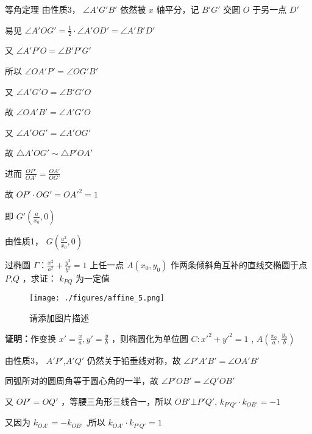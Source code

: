 \begin{corollary}{}
\begin{corollary}{等角定理}
由性质3， $\displaystyle{\angle A'G'B'}$ 依然被 $\displaystyle{x}$ 轴平分，记 $\displaystyle{B'G'}$ 交圆 $\displaystyle{O}$ 于另一点 $\displaystyle{D'}$

易见 $\displaystyle{\angle A'OG'=\frac{1}{2}\cdot\angle A'OD'=\angle A'B'D'}$ 

又 $\displaystyle{\angle A'P'O=\angle B'P'G'}$

所以 $\displaystyle{\angle OA'P'=\angle OG'B'}$

又 $\displaystyle{\angle A'G'O=\angle B'G'O}$

故 $\displaystyle{\angle OA'B'=\angle A'G'O}$

又 $\displaystyle{\angle A'OG'=\angle A'OG'}$

故 $\displaystyle{\triangle A'OG'\sim \triangle P'OA'}$

进而 $\displaystyle{\frac{OP'}{OA'}=\frac{OA'}{OG'}}$

故 $\displaystyle{OP'\cdot OG'=OA'^2=1}$ 

即 $\displaystyle{G'\left(\frac{a}{x_0},0\right)}$

由性质1， $\displaystyle{G\left( \frac{a^2}{x_0},0\right)}$ 

\end{corollary}

\begin{corollary}{}
过椭圆 $\displaystyle{\Gamma：\frac{x^2}{a^2}+\frac{y^2}{b^2}=1}$ 上任一点 $\displaystyle{A(x_0,y_0)}$ 作两条倾斜角互补的直线交椭圆于点 $\displaystyle{P}$,$\displaystyle{Q}$ ，求证： $\displaystyle{k_{PQ}}$ 为一定值
\begin{figure}[ht]
\centering
\texttt{[image: ./figures/affine\_5.png]}
\caption{请添加图片描述} \label{affine_fig5}
\end{figure}
\textbf{证明：}作变换 $\displaystyle{x'=\frac{x}{a},y'=\frac{y}{b}}$ ，则椭圆化为单位圆 $\displaystyle{C:x'^2+y'^2=1}$ , $\displaystyle{A\left(\frac{x_0}{a},\frac{y_0}{b}\right)}$ 

由性质3， $\displaystyle{A'P'}$,$\displaystyle{A'Q'}$ 仍然关于铅垂线对称，故 $\displaystyle{\angle P'A'B'=\angle OA'B'}$

同弧所对的圆周角等于圆心角的一半，故 $\displaystyle{\angle P'OB'=\angle Q'OB'}$

又 $\displaystyle{OP'=OQ'}$ ，等腰三角形三线合一，所以 $\displaystyle{OB'\bot P'Q' }$, $\displaystyle{k_{P'Q'}\cdot k_{OB'}=-1}$

又因为 $\displaystyle{k_{OA'}=-k_{OB'}}$ ,所以 $\displaystyle{k_{OA'}\cdot k_{P'Q'}=1}$


\end{corollary}
\end{corollary}
